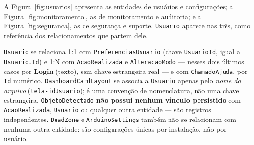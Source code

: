 A Figura~\ref{fig:usuarios} apresenta as entidades de usuários e configurações; a
Figura~\ref{fig:monitoramento}, as de monitoramento e auditoria; e a
Figura~\ref{fig:seguranca}, as de segurança e suporte. \texttt{Usuario} aparece nas três, como
referência dos relacionamentos que partem dele.

\texttt{Usuario} se relaciona 1:1 com \texttt{PreferenciasUsuario} (chave \texttt{UsuarioId},
igual a \texttt{Usuario.Id}) e 1:N com \texttt{AcaoRealizada} e \texttt{AlteracaoModo} — nesses
dois últimos casos por \textbf{Login} (texto), sem chave estrangeira real — e com
\texttt{ChamadoAjuda}, por \texttt{Id} numérico. \texttt{DashboardCardLayout} se associa a
\texttt{Usuario} apenas pelo \emph{nome do arquivo} (\texttt{tela-idUsuario}); é uma convenção de
nomenclatura, não uma chave estrangeira. \texttt{ObjetoDetectado} \textbf{não possui nenhum
vínculo persistido} com \texttt{AcaoRealizada}, \texttt{Usuario} ou qualquer outra entidade — são
registros independentes. \texttt{DeadZone} e \texttt{ArduinoSettings} também não se relacionam
com nenhuma outra entidade: são configurações únicas por instalação, não por usuário.

